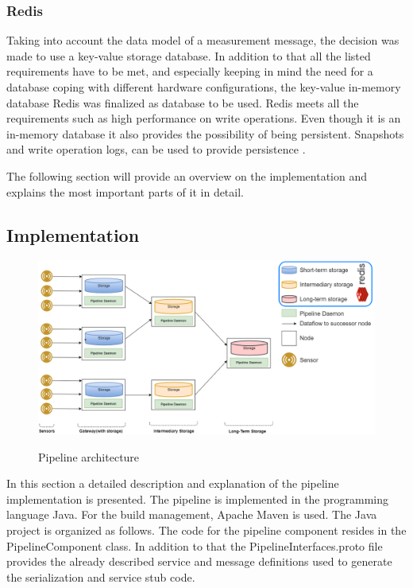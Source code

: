 \subsubsection{Redis}
Taking into account the data model of a measurement message, the decision was made to use a key-value storage database. In addition to that all the listed requirements have to be met, and especially keeping in mind the need for a database coping with different hardware configurations, the key-value in-memory database Redis was finalized as database to be used.
Redis meets all the requirements such as high performance on write operations. Even though it is an in-memory database it also provides the possibility of being persistent. Snapshots and write operation logs, can be used to provide persistence \cite{redis}. 

The following section will provide an overview on the implementation and explains the most important parts of it in detail.
\subsection{Implementation}

\begin{figure}[h]
\centering
\includegraphics[width=\linewidth]{figures/pipelinearchitecture.png}\\
\caption{Pipeline architecture}
\label{pipeline_arch}
\end{figure}
In this section a detailed description and explanation of the pipeline implementation is presented. The pipeline is implemented in the programming language Java. For the build management, Apache Maven is used. The Java project is organized as follows. The code for the pipeline component resides in the PipelineComponent class. In addition to that the PipelineInterfaces.proto file provides the already described service and message definitions used to generate the serialization and service stub code. 

